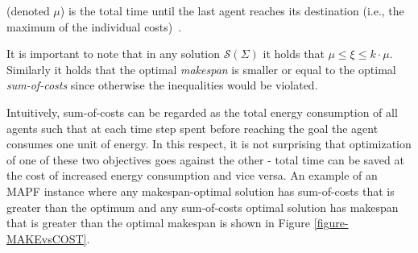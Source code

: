 \documentclass[jair,oneside,11pt]{article}
\begin{document}
 (denoted $\mu$) is the total time until the last
agent reaches its destination (i.e., the maximum of the individual
costs)~\cite{DBLP:conf/aaai/Surynek10,DBLP:conf/ictai/Surynek14,DBLP:conf/ijcai/Surynek15}.
\vspace{0.25cm}

It is important to note that in any solution $\mathcal{S}(\Sigma)$ it holds
that $\mu \leq \xi \leq {k\cdot\mu}$. Similarly it holds that the optimal \textit{makespan} is
smaller or equal to the optimal \textit{sum-of-costs} since otherwise the inequalities would be violated.

Intuitively, sum-of-costs can be regarded as the total energy consumption of all agents such that at each time step spent before reaching the goal the agent consumes one unit of energy. In this respect, it is not surprising that optimization of one of these two objectives goes against the other - total time can be saved at the cost of increased energy consumption and vice versa. An example of an MAPF instance where any makespan-optimal solution has sum-of-costs that is greater than the optimum and any sum-of-costs optimal solution has makespan that is greater than the optimal makespan is shown in Figure \ref{figure-MAKEvsCOST}.
\end{document}
